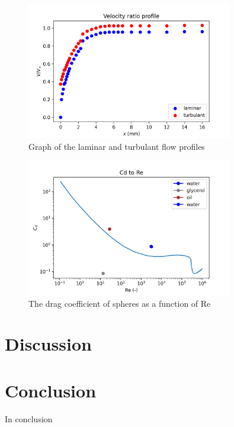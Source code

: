 \documentclass{article}
\begin{document}
\begin{figure}
\centering
\includegraphics[width=0.8\textwidth]{velocity_profiles.png}
\caption{\label{fig:velocity_profiles} Graph of the laminar and turbulant flow profiles}
\end{figure}


\begin{figure}
\centering
\includegraphics[width=0.8\textwidth]{CdRe_graph.png}
\caption{\label{fig:CdRe_graph} The drag coefficient of spheres as a function of Re}
\end{figure}

\section{Discussion}


\section{Conclusion}

In conclusion
\end{document}
